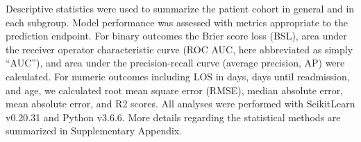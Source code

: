 Descriptive statistics were used to summarize the patient cohort in general and in each subgroup. 
Model performance was assessed with metrics appropriate to the prediction endpoint. 
For binary outcomes the Brier score loss (BSL), 
area under the receiver operator characteristic curve (ROC AUC, here abbreviated as simply “AUC”), 
and area under the precision-recall curve (average precision, AP) were calculated. 
For numeric outcomes including LOS in days, days until readmission, and age, 
we calculated root mean square error (RMSE), median absolute error, mean absolute error, and R2 scores. 
All analyses were performed with ScikitLearn v0.20.31\supercite{scikit-learn} and Python v3.6.6. 
More details regarding the statistical methods are summarized in Supplementary Appendix. 
